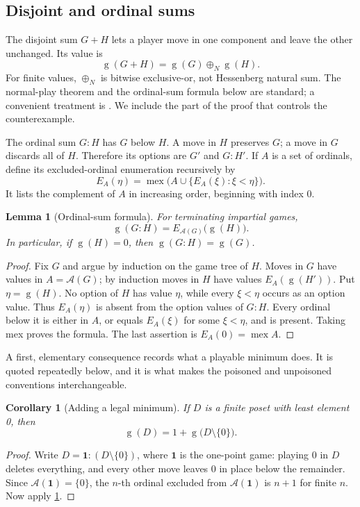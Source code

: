 \documentclass[11pt,letterpaper]{article}
\numberwithin{equation}{section}
\newtheorem{lemma}[theorem]{Lemma}
\newtheorem{corollary}[theorem]{Corollary}
\theoremstyle{definition}
\theoremstyle{remark}
\newcommand{\sg}{\operatorname{g}}
\newcommand{\mex}{\operatorname{mex}}
\newcommand{\opt}{\mathcal A}
\newcommand{\nimadd}{\mathbin{\oplus_{\!N}}}
\begin{document}
\subsection{Disjoint and ordinal sums}

The disjoint sum $G+H$ lets a player move in one component and leave
the other unchanged. Its value is
\begin{equation}\label{eq:disjoint}
 \sg(G+H)=\sg(G)\nimadd\sg(H).
\end{equation}
For finite values, $\nimadd$ is bitwise exclusive-or, not Hessenberg
natural sum. The normal-play theorem and the ordinal-sum formula
below are standard; a convenient treatment is
\cite[Sections 2 and 4, especially Theorem 2.6]{GT21}.
We include the part of the proof that controls the counterexample.

The ordinal sum $G:H$ has $G$ below $H$. A move in $H$ preserves $G$;
a move in $G$ discards all of $H$. Therefore its options are $G'$ and
$G:H'$. If $A$ is a set of ordinals, define its excluded-ordinal
enumeration recursively by
\begin{equation}\label{eq:excluded}
 E_A(\eta)=\mex\bigl(A\cup\{E_A(\xi):\xi<\eta\}\bigr).
\end{equation}
It lists the complement of $A$ in increasing order, beginning with
index 0.

\begin{lemma}[Ordinal-sum formula]\label{lem:colon}
For terminating impartial games,
\[
 \sg(G:H)=E_{\opt(G)}\bigl(\sg(H)\bigr).
\]
In particular, if $\sg(H)=0$, then $\sg(G:H)=\sg(G)$.
\end{lemma}
\begin{proof}
Fix $G$ and argue by induction on the game tree of $H$. Moves in $G$
have values in $A=\opt(G)$; by induction moves in $H$ have values
$E_A(\sg(H'))$. Put $\eta=\sg(H)$. No option of $H$ has value
$\eta$, while every $\xi<\eta$ occurs as an option value. Thus
$E_A(\eta)$ is absent from the option values of $G:H$. Every ordinal
below it is either in $A$, or equals $E_A(\xi)$ for some
$\xi<\eta$, and is present. Taking mex proves the formula. The last
assertion is $E_A(0)=\mex A$.
\end{proof}

A first, elementary consequence records what a playable minimum does. It
is quoted repeatedly below, and it is what makes the poisoned and
unpoisoned conventions interchangeable.

\begin{corollary}[Adding a legal minimum]\label{cor:min-shift}
If $D$ is a finite poset with least element 0, then
\begin{equation}\label{eq:min-shift}
 \sg(D)=1+\sg\bigl(D\setminus\{0\}\bigr).
\end{equation}
\end{corollary}
\begin{proof}
Write $D=\mathbf1:(D\setminus\{0\})$, where $\mathbf1$ is the one-point
game: playing 0 in $D$ deletes everything, and every other move leaves 0
in place below the remainder. Since $\opt(\mathbf1)=\{0\}$, the $n$-th
ordinal excluded from $\opt(\mathbf1)$ is $n+1$ for finite $n$. Now apply
\cref{lem:colon}.
\end{proof}
\end{document}

